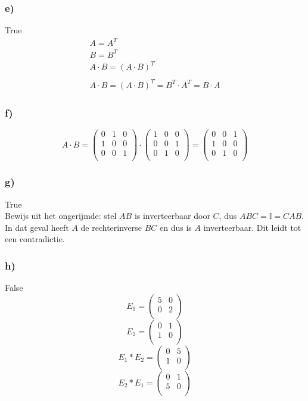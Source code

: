 \documentclass[lineaire_algebra_oplossingen.tex]{subfiles}
\begin{document}
\subsubsection*{e)}
True
\begin{gather*}
A=A^{T}\\
B=B^{T}\\
A \cdot B=(A \cdot B)^{T}\\
\\
A \cdot B=(A \cdot B)^{T}=B^T \cdot A^T=B \cdot A
\end{gather*}

\subsubsection*{f)}
\[
A \cdot B = \left( \begin{array}{ccc}
    0 & 1 & 0 \\
    1 & 0 & 0 \\
    0 & 0 & 1 \\
  \end{array} \right)  \cdot  \left( \begin{array}{ccc}
    1 & 0 & 0 \\
    0 & 0 & 1 \\
    0 & 1 & 0 \\
  \end{array} \right) = \left( \begin{array}{ccc}
    0 & 0 & 1 \\
    1 & 0 & 0 \\
    0 & 1 & 0 \\
 \end{array} \right) 
 \]

\subsubsection*{g)}
True\\
Bewijs uit het ongerijmde: stel $AB$ is inverteerbaar door $C$, dus $ABC = \mathbb{I} = CAB$. In dat geval heeft $A$ de rechterinverse $BC$ en dus is $A$ inverteerbaar. Dit leidt tot een contradictie.

\subsubsection*{h)}
False
\[
E_1=\left( \begin{array}{cc}
    5 & 0\\
    0 & 2\\
\end{array}\right)
\]
\[
E_2=\left( \begin{array}{cc}
    0 & 1\\
    1 & 0\\
\end{array}\right)
\]
\[
E_1*E_2=\left( \begin{array}{cc}
    0 & 5\\
    1 & 0\\
\end{array}\right)
\]
\[
E_2*E_1=\left( \begin{array}{cc}
    0 & 1\\
    5 & 0\\
\end{array}\right)
\]
\end{document}

